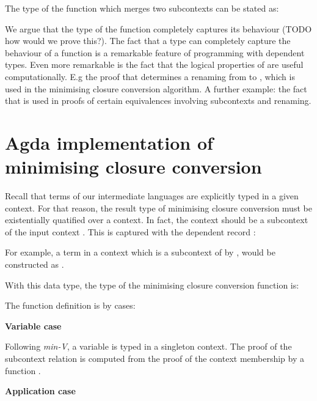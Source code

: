 \documentclass[bsc,frontabs,oneside,singlespacing,parskip,deptreport]{infthesis}
\theoremstyle{definition}
\theoremstyle{lemma}
\begin{document}
The type of the function which merges two subcontexts can be stated
as:


We argue that the type of the function completely captures its
behaviour (TODO how would we prove this?). The fact that a type can
completely capture the behaviour of a function is a remarkable feature
of programming with dependent types. Even more remarkable is the fact
that the logical properties of  are useful computationally. E.g
the proof that  determines a renaming from  to
, which is used in the minimising closure conversion
algorithm. A further example: the fact that  is used in proofs of certain equivalences involving subcontexts
and renaming.

\section{Agda implementation of minimising closure conversion}
\label{sec:agda-impl-minim}

Recall that terms of our intermediate languages are explicitly typed
in a given context. For that reason, the result type of minimising
closure conversion must be existentially quatified over a
context. In fact, the context should be a subcontext of the input
context . This is captured with the dependent record
:


For example, a term  in a context  which is a subcontext
of  by , would be constructed as .

With this data type, the type of the minimising closure conversion
function is:


The function definition is by cases:

\textbf{Variable case}


Following \textit{min-V}, a variable is typed in a singleton
context. The proof of the subcontext relation is computed from the
proof of the context membership by a function .

\textbf{Application case}

\end{document}
